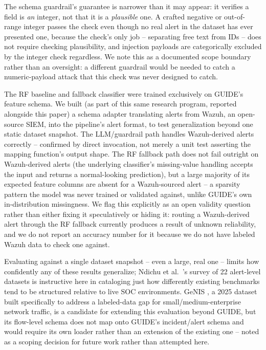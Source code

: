 \documentclass[conference]{IEEEtran}
\begin{document}
The schema guardrail's guarantee is narrower than it may appear: it verifies a field is
\emph{an} integer, not that it is a \emph{plausible} one. A crafted negative or out-of-range
integer passes the check even though no real alert in the dataset has ever presented one,
because the check's only job -- separating free text from IDs -- does not require checking
plausibility, and injection payloads are categorically excluded by the integer check regardless.
We note this as a documented scope boundary rather than an oversight: a different guardrail would
be needed to catch a numeric-payload attack that this check was never designed to catch.

The RF baseline and fallback classifier were trained exclusively on GUIDE's feature schema. We
built (as part of this same research program, reported alongside this paper) a schema adapter
translating alerts from Wazuh, an open-source SIEM, into the pipeline's alert format, to test
generalization beyond one static dataset snapshot. The LLM/guardrail path handles Wazuh-derived
alerts correctly -- confirmed by direct invocation, not merely a unit test asserting the mapping
function's output shape. The RF fallback path does not fail outright on Wazuh-derived alerts (the
underlying classifier's missing-value handling accepts the input and returns a normal-looking
prediction), but a large majority of its expected feature columns are absent for a Wazuh-sourced
alert -- a sparsity pattern the model was never trained or validated against, unlike GUIDE's own
in-distribution missingness. We flag this explicitly as an open validity question rather than
either fixing it speculatively or hiding it: routing a Wazuh-derived alert through the RF fallback
currently produces a result of unknown reliability, and we do not report an accuracy number for it
because we do not have labeled Wazuh data to check one against.

Evaluating against a single dataset snapshot -- even a large, real one -- limits how confidently
any of these results generalize; Ndichu et al.\ \cite{ndichu2026survey}'s survey of 22 alert-level
datasets is instructive here in cataloging just how differently existing benchmarks tend to be
structured relative to live SOC environments. GeNIS \cite{genis2025}, a 2025 dataset built
specifically to address a labeled-data gap for small/medium-enterprise network traffic, is a
candidate for extending this evaluation beyond GUIDE, but its flow-level schema does not map onto
GUIDE's incident/alert schema and would require its own loader rather than an extension of the
existing one -- noted as a scoping decision for future work rather than attempted here.
\end{document}
